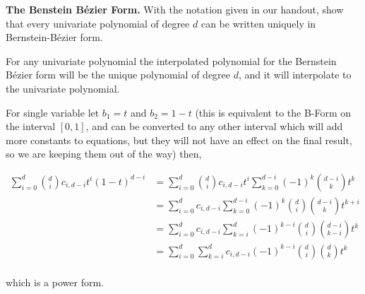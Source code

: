 \textbf{The Benstein B\'ezier Form.} With the notation given in our
handout, show that every univariate polynomial of degree $d$ can be
written uniquely in Bernstein-B\'ezier form.

{\color{blue}

For any univariate polynomial the interpolated polynomial for the
Bernstein B\'ezier form will be the unique polynomial of degree $d$,
and it will interpolate to the univariate polynomial.

{\color{blue}

For single variable let $b_1 = t$ and $b_2 = 1 - t$ (this is
equivalent to the B-Form on the interval $[0,1]$, and can be converted
to any other interval which will add more constants to equations, but
they will not have an effect on the final result, so we are keeping
them out of the way) then,

\begin{align*}
\sum_{i=0}^d {d \choose i} c_{i,d-i} t^i (1-t)^{d-i}
&= \sum_{i=0}^d {d \choose i} c_{i,d-i} t^i \sum_{k=0}^{d-i} (-1)^k {d-i \choose k} t^k \\
&= \sum_{i=0}^d c_{i,d-i} \sum_{k=0}^{d-i} (-1)^k {d \choose i} {d-i \choose k} t^{k+i} \\
&= \sum_{i=0}^d c_{i,d-i} \sum_{k=i}^d (-1)^{k-i} {d \choose i} {d-i \choose k-i} t^k \\
&= \sum_{i=0}^d \sum_{k=i}^d c_{i,d-i} (-1)^{k-i} {d \choose i} {d \choose k} t^k \\
\end{align*}

which is a power form.

}

}
